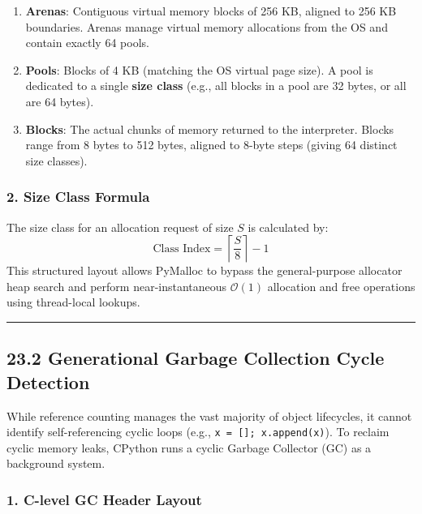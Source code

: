 \begin{enumerate}
\def\labelenumi{\arabic{enumi}.}
\tightlist
\item
  \textbf{Arenas}: Contiguous virtual memory blocks of 256 KB, aligned
  to 256 KB boundaries. Arenas manage virtual memory allocations from
  the OS and contain exactly 64 pools.
\item
  \textbf{Pools}: Blocks of 4 KB (matching the OS virtual page size). A
  pool is dedicated to a single \textbf{size class} (e.g., all blocks in
  a pool are 32 bytes, or all are 64 bytes).
\item
  \textbf{Blocks}: The actual chunks of memory returned to the
  interpreter. Blocks range from 8 bytes to 512 bytes, aligned to 8-byte
  steps (giving 64 distinct size classes).
\end{enumerate}

\hypertarget{size-class-formula}{%
\subsubsection{2. Size Class Formula}\label{size-class-formula}}

The size class for an allocation request of size \(S\) is calculated by:
\[\text{Class Index} = \left\lceil \frac{S}{8} \right\rceil - 1\] This
structured layout allows PyMalloc to bypass the general-purpose
allocator heap search and perform near-instantaneous \(\mathcal{O}(1)\)
allocation and free operations using thread-local lookups.

\begin{center}\rule{0.5\linewidth}{0.5pt}\end{center}

\hypertarget{generational-garbage-collection-cycle-detection}{%
\subsection{23.2 Generational Garbage Collection Cycle
Detection}\label{generational-garbage-collection-cycle-detection}}

While reference counting manages the vast majority of object lifecycles,
it cannot identify self-referencing cyclic loops (e.g.,
\passthrough{\lstinline!x = []; x.append(x)!}). To reclaim cyclic memory
leaks, CPython runs a cyclic Garbage Collector (GC) as a background
system.

\hypertarget{c-level-gc-header-layout}{%
\subsubsection{1. C-level GC Header
Layout}\label{c-level-gc-header-layout}}

